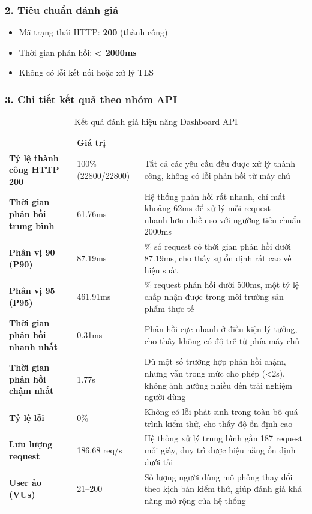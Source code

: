 \subsubsection*{2. Tiêu chuẩn đánh giá}
\begin{itemize}[label=--]
\item Mã trạng thái HTTP: \textbf{200} (thành công)
\item Thời gian phản hồi: \textbf{< 2000ms}
\item Không có lỗi kết nối hoặc xử lý TLS
\end{itemize}

\subsubsection*{3. Chi tiết kết quả theo nhóm API}
\begin{table}[H]
\centering
\caption{Kết quả đánh giá hiệu năng Dashboard API}
\begin{tabular}{|>{\raggedright\arraybackslash}p{4cm}|l|>{\raggedright\arraybackslash}p{7cm}|}
\hline
\multicolumn{1}{|c|}{\textbf{Chỉ số đánh giá}} & \textbf{Giá trị} & \multicolumn{1}{c|}{\textbf{Phân tích}} \\
\hline
\textbf{Tỷ lệ thành công HTTP 200} & 100\% (22800/22800) & Tất cả các yêu cầu đều được xử lý thành công, không có lỗi phản hồi từ máy chủ \\
\hline
\textbf{Thời gian phản hồi trung bình} & 61.76ms & Hệ thống phản hồi rất nhanh, chỉ mất khoảng 62ms để xử lý mỗi request — nhanh hơn nhiều so với ngưỡng tiêu chuẩn 2000ms \\
\hline
\textbf{Phân vị 90 (P90)} & 87.19ms & 90\% số request có thời gian phản hồi dưới 87.19ms, cho thấy sự ổn định rất cao về hiệu suất \\
\hline
\textbf{Phân vị 95 (P95)} & 461.91ms & 95\% request phản hồi dưới 500ms, một tỷ lệ chấp nhận được trong môi trường sản phẩm thực tế \\
\hline
\textbf{Thời gian phản hồi nhanh nhất} & 0.31ms & Phản hồi cực nhanh ở điều kiện lý tưởng, cho thấy không có độ trễ từ phía máy chủ \\
\hline
\textbf{Thời gian phản hồi chậm nhất} & 1.77s & Dù một số trường hợp phản hồi chậm, nhưng vẫn trong mức cho phép (<2s), không ảnh hưởng nhiều đến trải nghiệm người dùng \\
\hline
\textbf{Tỷ lệ lỗi} & 0\% & Không có lỗi phát sinh trong toàn bộ quá trình kiểm thử, cho thấy độ ổn định cao \\
\hline
\textbf{Lưu lượng request} & 186.68 req/s & Hệ thống xử lý trung bình gần 187 request mỗi giây, duy trì được hiệu năng ổn định dưới tải \\
\hline
\textbf{User ảo (VUs)} & 21--200 & Số lượng người dùng mô phỏng thay đổi theo kịch bản kiểm thử, giúp đánh giá khả năng mở rộng của hệ thống \\
\hline
\end{tabular}

\end{table}

